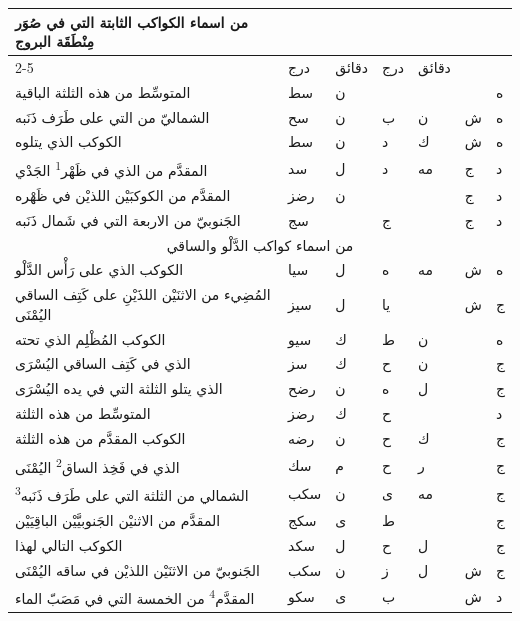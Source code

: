 \documentclass[11pt]{article}
\newcommand{\AbjadZero}{{\NallinoSigns\symbol{"E000}}}
\begin{document}
\begin{Arabic}\begin{tabular}{|p{84mm}|>{\centering\arraybackslash}p{9mm}|>{\centering\arraybackslash}p{9mm}|>{\centering\arraybackslash}p{9mm}|>{\centering\arraybackslash}p{9mm}|>{\centering\arraybackslash}p{14mm}|>{\centering\arraybackslash}p{17mm}|}\hline
\multirow{2}{*}{\parbox{80mm}{\centering من اسماء الكواكب الثابتة التي في صُوَر مِنْطَقَة البروج}} & \multicolumn{2}{c|}{الطول} & \multicolumn{2}{c|}{العرض} & \multirow{2}{*}{\parbox{13mm}{\centering\small علامات الجهة}} & \multirow{2}{*}{\parbox{16mm}{\centering\small مراتب العظمة}} \\ \cline{2-5}
 & {\small درج} & {\small دقائق} & {\small درج} & {\small دقائق} & & \\ \hline
المتوسِّط من هذه الثلثة الباقية & سط & ن & \AbjadZero{} & \AbjadZero{} & \AbjadZero{} & ه \\
الشماليّ من التي على طَرَف ذَنَبه & سح & ن & ب & ن & ش & ه \\
الكوكب الذي يتلوه & سط & ن & د & ك & ش & ه \\
المقدَّم من الذي في ظَهْر\textsuperscript{1} الجَدْي & سد & ل & د & مه & ج & د \\
المقدَّم من الكوكبَيْن اللذيْن في ظَهْره & رضز & ن & \AbjadZero{} & \AbjadZero{} & ج & د \\
الجَنوبيّ من الاربعة التي في شَمال ذَنَبه & سج & \AbjadZero{} & ج & \AbjadZero{} & ج & د \\
\hline
\multicolumn{7}{|c|}{\large من اسماء كواكب الدَّلْو والساقي} \\ \hline
الكوكب الذي على رَأْس الدَّلْو & سيا & ل & ه & مه & ش & ه \\
المُضِيء من الاثنَيْن اللذَيْنِ على كَتِف الساقي اليُمْنَى & سيز & ل & يا & \AbjadZero{} & ش & ج \\
الكوكب المُظْلِم الذي تحته & سيو & ك & ط & ن &  & ه \\
الذي في كَتِف الساقي اليُسْرَى & سز & ك & ح & ن &  & ج \\
الذي يتلو الثلثة التي في يده اليُسْرَى & رضح & ن & ه & ل &  & ج \\
المتوسِّط من هذه الثلثة & رضز & ك & ح & \AbjadZero{} &  & د \\
الكوكب المقدَّم من هذه الثلثة & رضه & ن & ح & ك &  & ج \\
الذي في فَخِذ الساق\textsuperscript{2} اليُمْنَى & سك & م & ح & ر &  & ج \\
الشمالي من الثلثة التي على طَرَف ذَنَبه\textsuperscript{3} & سكب & ن & ى & مه &  & ج \\
المقدَّم من الاثنيْن الجَنوبيَّيْن الباقِيَيْن & سكج & ى & ط & \AbjadZero{} &  & ج \\
الكوكب التالي لهذا & سكد & ل & ح & ل &  & ج \\
الجَنوبيّ من الاثنَيْن اللذيْن في ساقه اليُمْنَى & سكب & ن & ز & ل & ش & ج \\
المقدَّم\textsuperscript{4} من الخمسة التي في مَصَبّ الماء & سكو & ى & ب & \AbjadZero{} & ش & د \\
\hline
\end{tabular}\end{Arabic}
\end{document}
